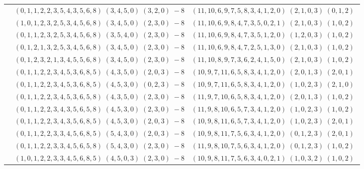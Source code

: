 \documentclass[11pt]{article}
\begin{document}
\begin{longtable}[l]{|c|c|c|}
 \cline{2-3} 
 & $(0 ,1 ,1 ,2 ,2 ,3 ,5 ,4 ,3 ,5 ,6 ,8) \;(3 ,4 ,5 ,0) \;(3 ,2 ,0) \;-8$ & $(11 ,10 ,6 ,9 ,7 ,5 ,8 ,3 ,4 ,1 ,2 ,0) \;(2 ,1 ,0 ,3) \;(0 ,1 ,2) \;$\\ 
 \cline{2-3} 
 & $(1 ,0 ,1 ,2 ,3 ,2 ,5 ,3 ,4 ,5 ,6 ,8) \;(3 ,4 ,5 ,0) \;(2 ,3 ,0) \;-8$ & $(11 ,10 ,6 ,9 ,8 ,4 ,7 ,3 ,5 ,0 ,2 ,1) \;(2 ,1 ,0 ,3) \;(1 ,0 ,2) \;$\\ 
 \cline{2-3} 
 & $(0 ,1 ,1 ,2 ,3 ,2 ,5 ,3 ,4 ,5 ,6 ,8) \;(3 ,5 ,4 ,0) \;(2 ,3 ,0) \;-8$ & $(11 ,10 ,6 ,9 ,8 ,4 ,7 ,3 ,5 ,1 ,2 ,0) \;(1 ,2 ,0 ,3) \;(1 ,0 ,2) \;$\\ 
 \cline{2-3} 
 & $(0 ,1 ,2 ,1 ,3 ,2 ,5 ,3 ,4 ,5 ,6 ,8) \;(3 ,4 ,5 ,0) \;(2 ,3 ,0) \;-8$ & $(11 ,10 ,6 ,9 ,8 ,4 ,7 ,2 ,5 ,1 ,3 ,0) \;(2 ,1 ,0 ,3) \;(1 ,0 ,2) \;$\\ 
 \cline{2-3} 
 & $(0 ,1 ,2 ,3 ,2 ,1 ,3 ,4 ,5 ,5 ,6 ,8) \;(3 ,4 ,5 ,0) \;(2 ,3 ,0) \;-8$ & $(11 ,10 ,8 ,9 ,7 ,3 ,6 ,2 ,4 ,1 ,5 ,0) \;(2 ,1 ,0 ,3) \;(1 ,0 ,2) \;$\\ 
 \cline{2-3} 
 & $(0 ,1 ,1 ,2 ,2 ,3 ,4 ,5 ,3 ,6 ,8 ,5) \;(4 ,3 ,5 ,0) \;(2 ,0 ,3) \;-8$ & $(10 ,9 ,7 ,11 ,6 ,5 ,8 ,3 ,4 ,1 ,2 ,0) \;(2 ,0 ,1 ,3) \;(2 ,0 ,1) \;$\\ 
 \cline{2-3} 
 & $(0 ,1 ,1 ,2 ,2 ,3 ,4 ,5 ,3 ,6 ,8 ,5) \;(4 ,5 ,3 ,0) \;(0 ,2 ,3) \;-8$ & $(10 ,9 ,7 ,11 ,6 ,5 ,8 ,3 ,4 ,1 ,2 ,0) \;(1 ,0 ,2 ,3) \;(2 ,1 ,0) \;$\\ 
 \cline{2-3} 
 & $(0 ,1 ,1 ,2 ,2 ,3 ,4 ,5 ,3 ,6 ,5 ,8) \;(4 ,3 ,5 ,0) \;(2 ,3 ,0) \;-8$ & $(11 ,9 ,7 ,10 ,6 ,5 ,8 ,3 ,4 ,1 ,2 ,0) \;(2 ,0 ,1 ,3) \;(1 ,0 ,2) \;$\\ 
 \cline{2-3} 
 & $(0 ,1 ,1 ,2 ,2 ,3 ,4 ,3 ,5 ,6 ,5 ,8) \;(4 ,5 ,3 ,0) \;(2 ,3 ,0) \;-8$ & $(11 ,9 ,8 ,10 ,6 ,5 ,7 ,3 ,4 ,1 ,2 ,0) \;(1 ,0 ,2 ,3) \;(1 ,0 ,2) \;$\\ 
 \cline{2-3} 
 & $(0 ,1 ,1 ,2 ,2 ,3 ,4 ,3 ,5 ,6 ,8 ,5) \;(4 ,5 ,3 ,0) \;(2 ,0 ,3) \;-8$ & $(10 ,9 ,8 ,11 ,6 ,5 ,7 ,3 ,4 ,1 ,2 ,0) \;(1 ,0 ,2 ,3) \;(2 ,0 ,1) \;$\\ 
 \cline{2-3} 
 & $(0 ,1 ,1 ,2 ,2 ,3 ,3 ,4 ,5 ,6 ,8 ,5) \;(5 ,4 ,3 ,0) \;(2 ,0 ,3) \;-8$ & $(10 ,9 ,8 ,11 ,7 ,5 ,6 ,3 ,4 ,1 ,2 ,0) \;(0 ,1 ,2 ,3) \;(2 ,0 ,1) \;$\\ 
 \cline{2-3} 
 & $(0 ,1 ,1 ,2 ,2 ,3 ,3 ,4 ,5 ,6 ,5 ,8) \;(5 ,4 ,3 ,0) \;(2 ,3 ,0) \;-8$ & $(11 ,9 ,8 ,10 ,7 ,5 ,6 ,3 ,4 ,1 ,2 ,0) \;(0 ,1 ,2 ,3) \;(1 ,0 ,2) \;$\\ 
 \cline{2-3} 
 & $(1 ,0 ,1 ,2 ,2 ,3 ,3 ,4 ,5 ,6 ,8 ,5) \;(4 ,5 ,0 ,3) \;(2 ,3 ,0) \;-8$ & $(10 ,9 ,8 ,11 ,7 ,5 ,6 ,3 ,4 ,0 ,2 ,1) \;(1 ,0 ,3 ,2) \;(1 ,0 ,2) \;$\\ 

\end{longtable}
\end{document}
